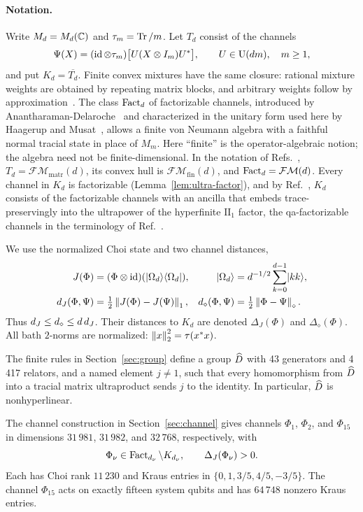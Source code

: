\documentclass[11pt]{article}
\begin{document}
\paragraph{Notation.}
Write $M_d=M_d(\mathbb C)$ and $\tau_m=\operatorname{Tr}/m$. Let $T_d$ consist of the channels
\begin{equation}
 \Psi(X)=(\operatorname{id}\otimes\tau_m)\bigl[U(X\otimes I_m)U^*\bigr],
 \qquad U\in\operatorname{U}(dm),\quad m\ge1,
 \label{eq:finite-factor}
\end{equation}
and put $K_d=\overline{T_d}$. Finite convex mixtures have the same closure: rational mixture
weights are obtained by repeating matrix blocks, and arbitrary weights follow by
approximation~\cite[Proposition~3.8(ii)]{musat}. The class $\operatorname{Fact}_d$ of factorizable
channels, introduced by Anantharaman-Delaroche~\cite{ad} and characterized in the unitary
form used here by Haagerup and Musat~\cite[Theorem~2.2]{hm11}, allows a finite von Neumann
algebra with a faithful normal tracial state in place of $M_m$. Here ``finite'' is the
operator-algebraic notion; the algebra need not be finite-dimensional. In the notation of
Refs.~\cite{mr21,musat}, $T_d=\mathcal{FM}_{\mathrm{matr}}(d)$, its convex hull is
$\mathcal{FM}_{\mathrm{fin}}(d)$, and $\operatorname{Fact}_d=\mathcal{FM}(d)$. Every channel in $K_d$ is
factorizable (Lemma~\ref{lem:ultra-factor}), and by Ref.~\cite[Theorem~3.6]{hm15}, $K_d$ consists of
the factorizable channels with an ancilla that embeds trace-preservingly into the ultrapower
of the hyperfinite $\mathrm{II}_1$ factor, the qa-factorizable channels in the terminology of
Ref.~\cite{pr}.

We use the normalized Choi state and two channel distances,
\begin{align}
 J(\Phi)&=(\Phi\otimes\operatorname{id})(\lvert \Omega_d\rangle\langle \Omega_d\rvert),
 &\lvert \Omega_d\rangle&=d^{-1/2}\sum_{k=0}^{d-1}\lvert kk\rangle,\\
 d_J(\Phi,\Psi)&=\tfrac12\left\lVert J(\Phi)-J(\Psi)\right\rVert_1,
 &d_\diamond(\Phi,\Psi)&=\tfrac12\left\lVert \Phi-\Psi\right\rVert_\diamond.
 \label{eq:distances}
\end{align}
Thus $d_J\le d_\diamond\le d\,d_J$. Their distances to $K_d$ are denoted
$\Delta_J(\Phi)$ and $\Delta_\diamond(\Phi)$. All bath $2$-norms are normalized:
$\left\lVert x\right\rVert_2^2=\tau(x^*x)$.

\begin{theorem}\label{thm:main}
The finite rules in Section~\ref{sec:group} define a group $\widehat D$ with 43 generators and
4\,417 relators, and a named element $j\ne1$, such that every homomorphism from $\widehat D$ into a
tracial matrix ultraproduct sends $j$ to the identity. In particular, $\widehat D$ is
nonhyperlinear.

The channel construction in Section~\ref{sec:channel} gives channels $\Phi_1$, $\Phi_2$,
and $\Phi_{15}$ in dimensions $31\,981$, $31\,982$, and $32\,768$, respectively, with
\begin{equation}
 \Phi_\nu\in\operatorname{Fact}_{d_\nu}\setminus K_{d_\nu},
 \qquad \Delta_J(\Phi_\nu)>0.
 \label{eq:main-separation}
\end{equation}
Each has Choi rank $11\,230$ and Kraus entries in $\{0,1,3/5,4/5,-3/5\}$.
The channel $\Phi_{15}$ acts on exactly fifteen system qubits and has $64\,748$ nonzero
Kraus entries.
\end{theorem}
\end{document}
